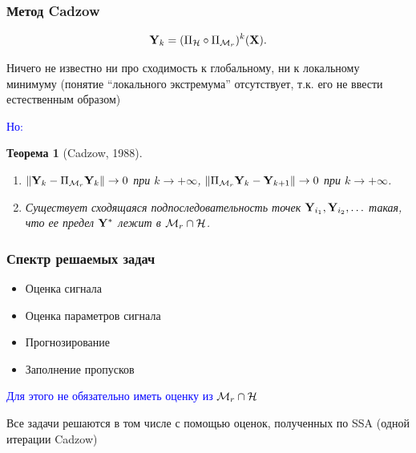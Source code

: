 \documentclass[unicode, notheorems]{beamer}
\newtheorem{theorem}{Теорема}
\begin{document}
\begin{frame}
	\frametitle{Метод Cadzow}
	\begin{equation*}
	\mathbf{Y}_k = (\Pi_{\mathcal{H}} \circ \Pi_{\mathcal{M}_r})^k (\mathbf{X}).
	\end{equation*}
	
	Ничего не известно ни про сходимость к глобальному, ни к локальному минимуму (понятие ``локального экстремума'' отсутствует, т.к. его не ввести естественным образом)

	\textcolor{blue}{Но:} 

	\begin{theorem}[Cadzow, 1988]
		\begin{enumerate}
			\item $\|\mathbf{Y}_k - \Pi_{\mathcal{M}_r} \mathbf{Y}_k\| \to 0$ при $k \to +\infty$, $\|\Pi_{\mathcal{M}_r}\mathbf{Y}_k - \mathbf{Y}_{k+1}\| \to 0$ при $k \to +\infty$.
			\item Существует сходящаяся подпоследовательность точек $\mathbf{Y}_{i_1}, \mathbf{Y}_{i_2}, \ldots$ такая, что ее предел $\mathbf{Y}^*$  лежит в $\mathcal{M}_r \cap \mathcal{H}$.
		\end{enumerate}
	\end{theorem}
\end{frame}

\begin{frame}
	\frametitle{Спектр решаемых задач}
	\begin{itemize}
		\item Оценка сигнала
		\item Оценка параметров сигнала
		\item Прогнозирование
		\item Заполнение пропусков
	\end{itemize}
	\vspace{0.4cm}
	\textcolor{blue}{Для этого не обязательно иметь оценку из $\mathcal{M}_r \cap \mathcal{H}$}
	
	Все задачи решаются в том числе с помощью оценок, полученных по SSA (одной итерации Cadzow)
\end{frame}
\end{document}
